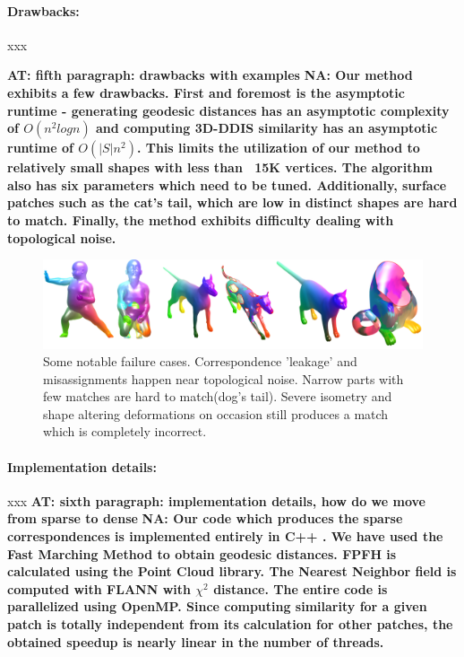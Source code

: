 \documentclass[10pt,twocolumn,letterpaper]{article}
\newcommand{\colornote}[3]{{\color{#1}\bf{#2: #3}\normalfont}}
\newcommand{\colornote}[3]{}
\newcommand {\ayellet}[1]{\colornote{blue}{AT}{#1}}
\newcommand {\nadav}[1]{\colornote{red}{NA}{#1}}
\begin{document}
\paragraph{Drawbacks:} xxx


\ayellet{fifth paragraph: drawbacks with examples}
\nadav{Our method exhibits a few drawbacks. First and foremost is the asymptotic runtime - generating geodesic distances has an asymptotic complexity of $O(n^2 logn)$ and computing 3D-DDIS similarity has an asymptotic runtime of $O(|S|n^2)$. This limits the utilization of our method to relatively small shapes with less than ~15K vertices. The algorithm also has six parameters which need to be tuned. Additionally, surface patches such as the cat's tail, which are low in distinct shapes are hard to match. Finally, the method exhibits difficulty dealing with topological noise.}

\begin{figure}[htb]
	\centering
	\includegraphics[width=1\textwidth]{figures/failures.png}
	\caption{Some notable failure cases. Correspondence 'leakage' and misassignments happen near topological noise. Narrow parts with few matches are hard to match(dog's tail). Severe isometry and shape altering deformations on occasion still produces a match which is completely incorrect.}
	\label{fig:FailureCases}
\end{figure}

\paragraph{Implementation details:} xxx
\ayellet{sixth paragraph: implementation details, how do we move from sparse to dense}
\nadav{Our code which produces the sparse correspondences is implemented entirely in C++ . 
We have used the Fast Marching Method\cite{kimmel1996fast} to obtain geodesic distances.
FPFH is calculated using the Point Cloud library\cite{Rusu_ICRA2011_PCL}. 
The Nearest Neighbor field is computed with FLANN\cite{muja2009fast} with $\chi^2$ distance.
The entire code is parallelized using OpenMP. Since computing similarity for a given patch is totally independent from its calculation for other patches, the obtained speedup is nearly linear in the number of threads. 
}
\end{document}

